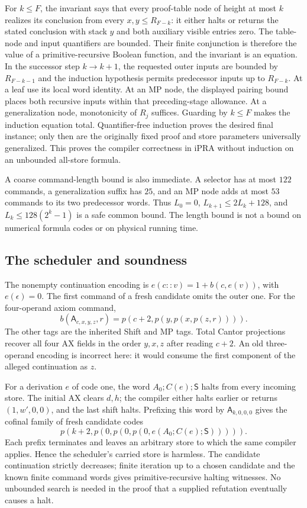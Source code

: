 For $k\le F$, the invariant says that every proof-table node of height
at most $k$ realizes its conclusion from every $x,y\le R_{F-k}$:
it either halts or returns the stated conclusion with stack $y$ and both
auxiliary visible entries zero. The table-node and input quantifiers are
bounded. Their finite conjunction is therefore the value of a
primitive-recursive Boolean function, and the invariant is an equation.
In the successor step $k\to k+1$, the requested outer inputs are
bounded by $R_{F-k-1}$ and the induction hypothesis permits predecessor
inputs up to $R_{F-k}$. At a leaf use its local word identity. At an MP
node, the displayed pairing bound places both recursive inputs within
that preceding-stage allowance. At a generalization node, monotonicity of $R_j$ suffices.
Guarding by $k\le F$ makes the induction equation total.
Quantifier-free induction proves the desired final instance; only then
are the originally fixed proof and store parameters universally generalized.
This proves the compiler correctness in iPRA without induction on an
unbounded all-store formula.

A coarse command-length bound is also immediate. A selector has at most
$122$ commands, a generalization suffix has $25$, and an MP node adds
at most $53$ commands to its two predecessor words. Thus
$L_0=0$, $L_{k+1}\le2L_k+128$, and $L_k\le128(2^k-1)$ is a safe common
bound. The length bound is not a bound on numerical formula codes or on
physical running time.

\subsection{The scheduler and soundness}

The nonempty continuation encoding is $e(c::v)=1+b(c,e(v))$, with
$e(\epsilon)=0$. The first command of a fresh candidate omits the outer
one. For the four-operand axiom command,
\[
 b(\mathsf A_{c,x,y,z},r)=p(c+2,p(y,p(x,p(z,r)))).
\]
The other tags are the inherited Shift and MP tags. Total Cantor
projections recover all four AX fields in the order $y,x,z$ after reading
$c+2$. An old three-operand encoding is incorrect here: it would consume
the first component of the alleged continuation as $z$.

For a derivation $e$ of code one, the word
$A_0;C(e);\mathsf S$ halts from every incoming store. The initial AX
clears $d,h$; the compiler either halts earlier or returns
$(1,w',0,0)$, and the last shift halts. Prefixing this word by
$\mathsf A_{k,0,0,0}$ gives the cofinal family of fresh candidate codes
\[
 p(k+2,p(0,p(0,p(0,e(A_0;C(e);\mathsf S))))).
\]
Each prefix terminates and leaves an arbitrary store to which the same
compiler applies. Hence the scheduler's carried store is harmless.
The candidate continuation strictly decreases; finite iteration up to a
chosen candidate and the known finite command words gives
primitive-recursive halting witnesses. No unbounded search is needed in
the proof that a supplied refutation eventually causes a halt.

